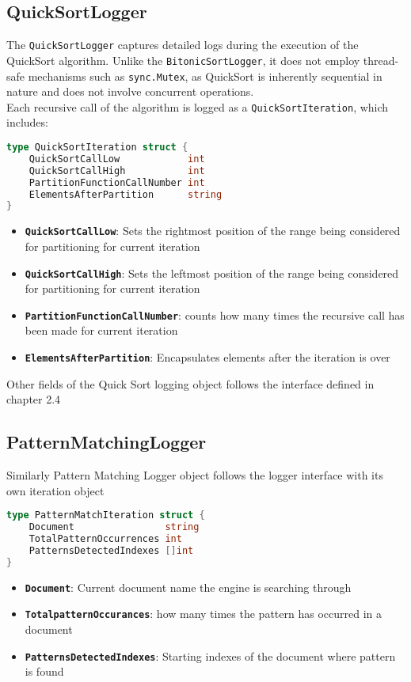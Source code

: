 \subsection{QuickSortLogger}
The \texttt{QuickSortLogger} captures detailed logs during the execution of the QuickSort algorithm. Unlike the \texttt{BitonicSortLogger}, it does not employ thread-safe mechanisms such as \texttt{sync.Mutex}, as QuickSort is inherently sequential in nature and does not involve concurrent operations. \\
Each recursive call of the algorithm is logged as a \texttt{QuickSortIteration}, which includes:
\begin{lstlisting}[language=Go]
    type QuickSortIteration struct {
	QuickSortCallLow            int    
	QuickSortCallHigh           int    
	PartitionFunctionCallNumber int    
	ElementsAfterPartition      string 
}
\end{lstlisting}

\begin{itemize}
    \item \textbf{\texttt{QuickSortCallLow}}: Sets the rightmost position of the range being considered for partitioning for current iteration

    \item \textbf{\texttt{QuickSortCallHigh}}: Sets the leftmost position of the range being considered for partitioning for current  iteration

    \item \textbf{\texttt{PartitionFunctionCallNumber}}: counts how many times the recursive call has been made for current iteration

    \item \textbf{\texttt{ElementsAfterPartition}}: Encapsulates elements after the iteration is over
\end{itemize}
Other fields of the Quick Sort logging object follows the interface defined in chapter 2.4

\subsection{PatternMatchingLogger}
Similarly Pattern Matching Logger object follows the logger interface with its own iteration object 
\begin{lstlisting}[language=Go]
    type PatternMatchIteration struct {
	Document                string 
	TotalPatternOccurrences int    
	PatternsDetectedIndexes []int  
}
\end{lstlisting}
\begin{itemize}
    \item \textbf{\texttt{Document}}: Current document name the engine is searching through

    \item \textbf{\texttt{TotalpatternOccurances}}: how many times the pattern has occurred in a document

    \item \textbf{\texttt{PatternsDetectedIndexes}}: Starting indexes of the document where pattern is found 
\end{itemize}


